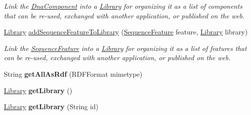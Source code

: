 \begin{DoxyCompactItemize}
\begin{DoxyCompactList}\small\item\em Link the \hyperlink{classorg_1_1sbolstandard_1_1lib_s_b_o_lj_1_1_dna_component}{DnaComponent} into a \hyperlink{classorg_1_1sbolstandard_1_1lib_s_b_o_lj_1_1_library}{Library} for organizing it as a list of components that can be re-\/used, exchanged with another application, or published on the web. \item\end{DoxyCompactList}\item 
\hyperlink{classorg_1_1sbolstandard_1_1lib_s_b_o_lj_1_1_library}{Library} \hyperlink{classorg_1_1sbolstandard_1_1lib_s_b_o_lj_1_1_sbol_service_ae387ca46de01accf2c313559d3783d1c}{addSequenceFeatureToLibrary} (\hyperlink{classorg_1_1sbolstandard_1_1lib_s_b_o_lj_1_1_sequence_feature}{SequenceFeature} feature, \hyperlink{classorg_1_1sbolstandard_1_1lib_s_b_o_lj_1_1_library}{Library} library)
\begin{DoxyCompactList}\small\item\em Link the \hyperlink{classorg_1_1sbolstandard_1_1lib_s_b_o_lj_1_1_sequence_feature}{SequenceFeature} into a \hyperlink{classorg_1_1sbolstandard_1_1lib_s_b_o_lj_1_1_library}{Library} for organizing it as a list of features that can be re-\/used, exchanged with another application, or published on the web. \item\end{DoxyCompactList}\item 
\hypertarget{classorg_1_1sbolstandard_1_1lib_s_b_o_lj_1_1_sbol_service_a7a6cf1a457b3b0fb7d797ec49ccb9eed}{
String {\bfseries getAllAsRdf} (RDFFormat mimetype)}
\label{classorg_1_1sbolstandard_1_1lib_s_b_o_lj_1_1_sbol_service_a7a6cf1a457b3b0fb7d797ec49ccb9eed}

\item 
\hypertarget{classorg_1_1sbolstandard_1_1lib_s_b_o_lj_1_1_sbol_service_af9a5066e34e18516151efd1305082f71}{
\hyperlink{classorg_1_1sbolstandard_1_1lib_s_b_o_lj_1_1_library}{Library} {\bfseries getLibrary} ()}
\label{classorg_1_1sbolstandard_1_1lib_s_b_o_lj_1_1_sbol_service_af9a5066e34e18516151efd1305082f71}

\item 
\hypertarget{classorg_1_1sbolstandard_1_1lib_s_b_o_lj_1_1_sbol_service_ae514a61ce2bda5351f853390e77afab5}{
\hyperlink{classorg_1_1sbolstandard_1_1lib_s_b_o_lj_1_1_library}{Library} {\bfseries getLibrary} (String id)}
\label{classorg_1_1sbolstandard_1_1lib_s_b_o_lj_1_1_sbol_service_ae514a61ce2bda5351f853390e77afab5}


\end{DoxyCompactItemize}
